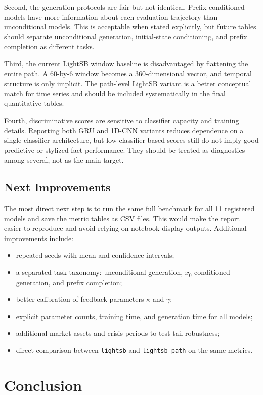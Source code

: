 \documentclass[11pt,a4paper]{article}
\begin{document}
Second, the generation protocols are fair but not identical. Prefix-conditioned
models have more information about each evaluation trajectory than
unconditional models. This is acceptable when stated explicitly, but future
tables should separate unconditional generation, initial-state conditioning,
and prefix completion as different tasks.

Third, the current LightSB window baseline is disadvantaged by flattening the
entire path. A 60-by-6 window becomes a 360-dimensional vector, and temporal
structure is only implicit. The path-level LightSB variant is a better
conceptual match for time series and should be included systematically in the
final quantitative tables.

Fourth, discriminative scores are sensitive to classifier capacity and training
details. Reporting both GRU and 1D-CNN variants reduces dependence on a single
classifier architecture, but low classifier-based scores still do not imply
good predictive or stylized-fact performance. They should be treated as
diagnostics among several, not as the main target.

\subsection{Next Improvements}

The most direct next step is to run the same full benchmark for all 11
registered models and save the metric tables as CSV files. This would make the
report easier to reproduce and avoid relying on notebook display outputs.
Additional improvements include:
\begin{itemize}
    \item repeated seeds with mean and confidence intervals;
    \item a separated task taxonomy: unconditional generation, $x_0$-conditioned
    generation, and prefix completion;
    \item better calibration of feedback parameters $\kappa$ and $\gamma$;
    \item explicit parameter counts, training time, and generation time for all
    models;
    \item additional market assets and crisis periods to test tail robustness;
    \item direct comparison between \texttt{lightsb} and
    \texttt{lightsb\_path} on the same metrics.
\end{itemize}

\section{Conclusion}
\end{document}
